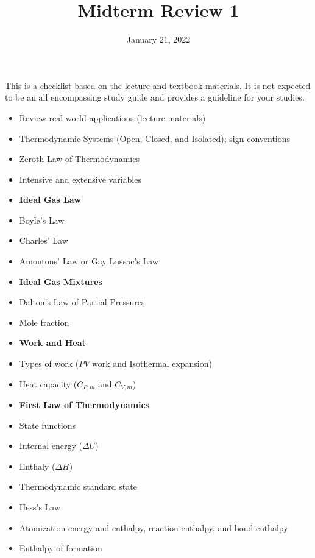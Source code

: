 \documentclass[11pt]{article}
\title{\textbf{Midterm Review 1}}
\date{\vspace{-2em}January 21, 2022}
\begin{document}
\maketitle

This is a checklist based on the lecture and textbook materials. It is not
expected to be an all encompassing study guide and provides a guideline for
your studies.

\begin{itemize}
\item Review real-world applications (lecture materials)
\item Thermodynamic Systems (Open, Closed, and Isolated); sign conventions
\item Zeroth Law of Thermodynamics
\item Intensive and extensive variables
\item[] \textbf{Ideal Gas Law}
\item Boyle's Law
\item Charles' Law
\item Amontons' Law or Gay Lussac's Law
\item[] \textbf{Ideal Gas Mixtures}
\item Dalton's Law of Partial Pressures
\item Mole fraction
\item[] \textbf{Work and Heat}
\item Types of work ($PV$ work and Isothermal expansion)
\item Heat capacity ($C_{P,m}$ and $C_{V,m}$)
\item[] \textbf{First Law of Thermodynamics}
\item State functions
\item Internal energy ($\Delta U$)
\item Enthaly ($\Delta H$)
\item Thermodynamic standard state
\item Hess's Law
\item Atomization energy and enthalpy, reaction enthalpy, and bond enthalpy
\item Enthalpy of formation
\end{itemize}
\end{document}
